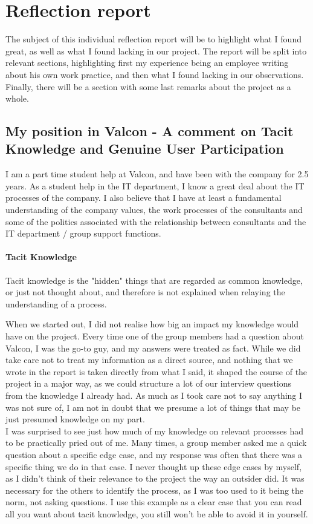 \chapter*{Reflection report}

The subject of this individual reflection report will be to highlight what I found great, as well as what I found lacking in our project. The report will be split into relevant sections, highlighting first my experience being an employee writing about his own work practice, and then what I found lacking in our observations. Finally, there will be a section with some last remarks about the project as a whole.

\section*{My position in Valcon - A comment on Tacit Knowledge and Genuine User Participation}
I am a part time student help at Valcon, and have been with the company for 2.5 years. As a student help in the IT department, I know a great deal about the IT processes of the company. I also believe that I have at least a fundamental understanding of the company values, the work processes of the consultants and some of the politics associated with the relationship between consultants and the IT department / group support functions.

\subsubsection{Tacit Knowledge}
Tacit knowledge is the "hidden" things that are regarded as common knowledge, or just not thought about, and therefore is not explained when relaying the understanding of a process.

When we started out, I did not realise how big an impact my knowledge would have on the project. Every time one of the group members had a question about Valcon, I was the go-to guy, and my answers were treated as fact. While we did take care not to treat my information as a direct source, and nothing that we wrote in the report is taken directly from what I said, it shaped the course of the project in a major way, as we could structure a lot of our interview questions from the knowledge I already had.
As much as I took care not to say anything I was not sure of, I am not in doubt that we presume a lot of things that may be just presumed knowledge on my part. \\

I was surprised to see just how much of my knowledge on relevant processes had to be practically pried out of me. Many times, a group member asked me a quick question about a specific edge case, and my response was often that there was a specific thing we do in that case. I never thought up these edge cases by myself, as I didn't think of their relevance to the project the way an outsider did. It was necessary for the others to identify the process, as I was too used to it being the norm, not asking questions. I use this example as a clear case that you can read all you want about tacit knowledge, you still won't be able to avoid it in yourself.

